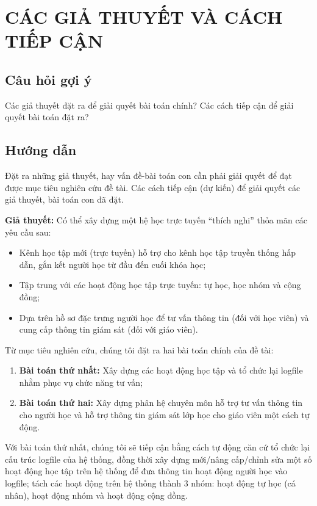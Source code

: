 \section*{CÁC GIẢ THUYẾT VÀ CÁCH TIẾP CẬN}
\subsection*{Câu hỏi gợi ý}
Các giả thuyết đặt ra để giải quyết bài toán chính? Các cách tiếp cận để giải quyết bài toán đặt ra?
\subsection*{Hướng dẫn}
Đặt ra những giả thuyết, hay vấn đề-bài toán con cần phải giải quyết để đạt được mục tiêu nghiên cứu đề tài. Các cách tiếp cận (dự kiến) để giải quyết các giả thuyết, bài toán con đã đặt.

\textbf{Giả thuyết:} Có thể xây dựng một hệ học trực tuyến “thích nghi” thỏa mãn các yêu cầu sau:
\begin{itemize}
    \item Kênh học tập mới (trực tuyến) hỗ trợ cho kênh học tập truyền thống hấp dẫn, gắn kết người học từ đầu đến cuối khóa học;
    \item Tập trung với các hoạt động học tập trực tuyến: tự học, học nhóm và cộng đồng;
    \item Dựa trên hồ sơ đặc trưng người học để tư vấn thông tin (đối với học viên) và cung cấp thông tin giám sát (đối với giáo viên).
\end{itemize}

Từ mục tiêu nghiên cứu, chúng tôi đặt ra hai bài toán chính của đề tài:
\begin{enumerate}
    \item \textbf{Bài toán thứ nhất:} Xây dựng các hoạt động học tập và tổ chức lại logfile nhằm phục vụ chức năng tư vấn;
    \item \textbf{Bài toán thứ hai:} Xây dựng phân hệ chuyên môn hỗ trợ tư vấn thông tin cho người học và hỗ trợ thông tin giám sát lớp học cho giáo viên một cách tự động.
\end{enumerate}

Với bài toán thứ nhất, chúng tôi sẽ tiếp cận bằng cách tự động căn cứ tổ chức lại cấu trúc logfile của hệ thống, đồng thời xây dựng mới/nâng cấp/chỉnh sửa một số hoạt động học tập trên hệ thống để đưa thông tin hoạt động người học vào logfile; tách các hoạt động trên hệ thống thành 3 nhóm: hoạt động tự học (cá nhân), hoạt động nhóm và hoạt động cộng đồng.

